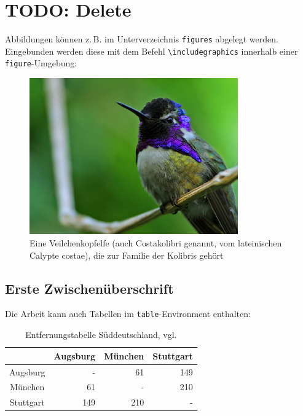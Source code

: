 \section{TODO: Delete}
\label{sec:Delete}
Abbildungen können z.\,B. im Unterverzeichnis \texttt{figures} abgelegt werden.
Eingebunden werden diese mit dem Befehl \texttt{\textbackslash includegraphics} innerhalb
einer \texttt{figure}-Umgebung:
\begin{figure}[htb]
  \centering
  \includegraphics[width=0.8\textwidth]{figures/Hummingbird.jpg}
  \caption{Eine Veilchenkopfelfe (auch Costakolibri genannt, vom lateinischen Calypte costae), die zur Familie der Kolibris gehört }
  \label{fig:kolibri}
\end{figure}

\subsection{Erste Zwischenüberschrift}
\label{sec:ErsteZwischenueberschrift}
Die Arbeit kann auch Tabellen im \texttt{table}-Environment enthalten:
\begin{table}[ht]
  \centering
  \caption{Entfernungstabelle Süddeutschland, vgl. \cite{entfernungstabelle}}
  \begin{tabular}{c r r r}
    \toprule
              & Augsburg & München & Stuttgart \\
    \midrule
    Augsburg  & -        & 61      & 149       \\
    München   & 61       & -       & 210       \\
    Stuttgart & 149      & 210     & -         \\
    \bottomrule
  \end{tabular}
  \label{tab:entfernungen}
\end{table}


